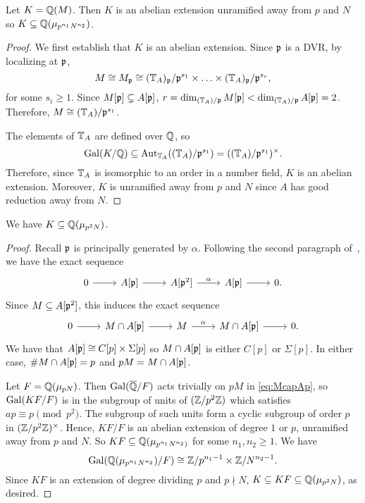 \documentclass[thesis.tex]{subfiles}
\begin{document}
\begin{lemma}
    \label{lem:abelian_extension}
    Let $K=\mathbb{Q}(M)$. Then $K$ is an abelian extension unramified away from $p$
    and $N$ so $K\subseteq \mathbb{Q}(\mu_{p^{n_1}N^{n_2}})$.
\end{lemma}
\begin{proof}
    We first establish that $K$ is an abelian extension. Since $\mathfrak{p}$ is a DVR,
    by localizing at $\mathfrak{p}$,
    \[
        M \cong M_{\mathfrak{p}} \cong (\mathbb{T}_A)_{\mathfrak{p}}/\mathfrak{p}^{s_1}\times \ldots\times
        (\mathbb{T}_A)_{\mathfrak{p}}/\mathfrak{p}^{s_r},
    \]
    for some $s_i\geq 1$. Since $M[\mathfrak{p}]\subsetneq A[\mathfrak{p}]$, $r=\dim_{(\mathbb{T}_A)/\mathfrak{p}}
    M[\mathfrak{p}]<\dim_{(\mathbb{T}_A)/\mathfrak{p}} A[\mathfrak{p}]=2$. Therefore, $M\cong (\mathbb{T}_A)/\mathfrak{p}^{s_1}$.

    The elements of $\mathbb{T}_A$ are defined over $\mathbb{Q}$, so
    \[
        \operatorname{Gal}(K/\mathbb{Q}) \subseteq \operatorname{Aut}_{\mathbb{T}_A}((\mathbb{T}_A)/\mathfrak{p}^{s_1}) =
        ((\mathbb{T}_A)/\mathfrak{p}^{s_1})^\times.
    \]
    Therefore, since $\mathbb{T}_A$ is isomorphic to an order in a number field, $K$
    is an abelian extension. Moreover, $K$ is unramified away from $p$ and $N$
    since $A$ has good reduction away from $N$.
\end{proof}

\begin{lemma}
    We have $K\subseteq \mathbb{Q}(\mu_{p^2N})$.
\end{lemma}
\begin{proof}
    Recall $\mathfrak{p}$ is principally generated by $\alpha$. Following the second
    paragraph of~\cite{mazur:eisenstein}, we have the exact sequence
    \[
        \begin{tikzcd}
            0 \arrow[r] &
            A[\p] \arrow[r] &
            A[\p^2] \arrow[r, "\alpha"] &
            A[\p] \arrow[r] &
            0.
        \end{tikzcd}
    \]
    Since $M\subseteq A[\mathfrak{p}^2]$, this induces the exact sequence
    \begin{equation}
        \label{eq:McapAp}
        \begin{tikzcd}
            0 \arrow[r] &
            M\cap A[\p] \arrow[r] &
            M \arrow[r, "\alpha"] &
            M\cap A[\p] \arrow[r] &
            0.
        \end{tikzcd}
    \end{equation}
    We have that $A[\mathfrak{p}]\cong C[p]\times \Sigma[p]$ so $M\cap A[\mathfrak{p}]$ is either
    $C[p]$ or $\Sigma[p]$. In either case, $\# M\cap A[\mathfrak{p}] = p$ and $pM=M\cap
    A[\mathfrak{p}]$.
    
    Let $F=\mathbb{Q}(\mu_{pN})$. Then $\operatorname{Gal}(\overline{\mathbb{Q}}/F)$ acts trivially on $pM$ in
    \eqref{eq:McapAp}, so $\operatorname{Gal}(KF/F)$ is in the subgroup of units of $(\mathbb{Z}/p^2
    \mathbb{Z})$ which satisfies $ap\equiv p \pmod{p^2}$. The subgroup of such units
    form a cyclic subgroup of order $p$ in $(\mathbb{Z}/p^2\mathbb{Z})^\times$. Hence, $KF/F$
    is an abelian extension of degree $1$ or $p$, unramified away from $p$ and
    $N$. So $KF\subseteq \mathbb{Q}(\mu_{p^{n_1}N^{n_2})}$ for some $n_1,n_2\geq 1$.
    We have
    \[
        \operatorname{Gal}(\mathbb{Q}(\mu_{p^{n_1}N^{n_2}})/F) \cong 
        \mathbb{Z}/p^{n_1-1} \times \mathbb{Z}/N^{n_2-1}.
    \]
    Since $KF$ is an extension of degree dividing $p$ and $p\nmid N$,
    $K\subseteq KF \subseteq \mathbb{Q}(\mu_{p^2N})$, as desired.
\end{proof}
\end{document}
